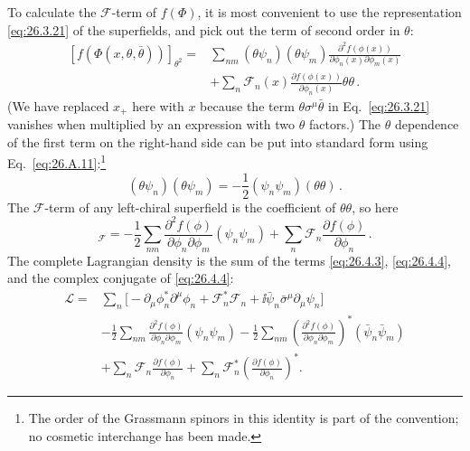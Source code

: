 To calculate the \(\mathcal{F}\)-term of \(f(\Phi)\), it is most convenient to
use the representation \eqref{eq:26.3.21} of the superfields, and pick out the
term of second order in \(\theta\):
\[
  \begin{aligned}
  [f(\Phi(x,\theta,\bar\theta))]_{\theta^2}
  ={}&\sum_{nm}
    (\theta\psi_n)(\theta\psi_m)
    \frac{\partial^2f(\phi(x))}
      {\partial\phi_n(x)\partial\phi_m(x)}
  \\
  &+\sum_n\mathcal{F}_n(x)
    \frac{\partial f(\phi(x))}{\partial\phi_n(x)}
    \theta\theta\,.
  \end{aligned}
\]
(We have replaced \(x_+\) here with \(x\) because the term
\(\theta\sigma^\mu\bar\theta\) in Eq.~\eqref{eq:26.3.21}
vanishes when multiplied by an expression with two \(\theta\) factors.)
The \(\theta\) dependence of the first term on the right-hand side can be put
into standard form using Eq.~\eqref{eq:26.A.11}:\footnote{The order of the
Grassmann spinors in this identity is part of the convention; no cosmetic
interchange has been made.}
\[
  (\theta\psi_n)(\theta\psi_m)
  =-\frac12(\psi_n\psi_m)(\theta\theta)\,.
\]
The \(\mathcal{F}\)-term of any left-chiral superfield is the coefficient of
\(\theta\theta\), so here
\begin{equation}
  [f(\Phi)]_{\mathcal{F}}
  =-\frac12\sum_{nm}
    \frac{\partial^2f(\phi)}{\partial\phi_n\partial\phi_m}
    (\psi_n\psi_m)
  +\sum_n\mathcal{F}_n\frac{\partial f(\phi)}{\partial\phi_n}\,.
  \tag{26.4.4}\label{eq:26.4.4}
\end{equation}
The complete Lagrangian density is the sum of the terms
\eqref{eq:26.4.3}, \eqref{eq:26.4.4}, and the complex conjugate of
\eqref{eq:26.4.4}:
\begin{equation}
  \begin{aligned}
  \mathcal{L}={}&
  \sum_n\biggl[
    -\partial_\mu\phi_n^*\partial^\mu\phi_n
    +\mathcal{F}_n^*\mathcal{F}_n
    +\ii\bar\psi_n\bar\sigma^\mu\partial_\mu\psi_n
  \biggr]
  \\
  &-\frac12\sum_{nm}
    \frac{\partial^2f(\phi)}{\partial\phi_n\partial\phi_m}
    (\psi_n\psi_m)
  -\frac12\sum_{nm}
    \left(\frac{\partial^2f(\phi)}
      {\partial\phi_n\partial\phi_m}\right)^*
    (\bar\psi_n\bar\psi_m)
  \\
  &+\sum_n\mathcal{F}_n\frac{\partial f(\phi)}{\partial\phi_n}
  +\sum_n\mathcal{F}_n^*
    \left(\frac{\partial f(\phi)}{\partial\phi_n}\right)^* .
  \end{aligned}
  \tag{26.4.5}\label{eq:26.4.5}
\end{equation}
